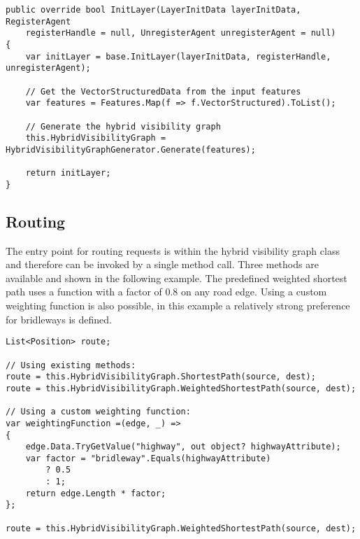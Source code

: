 		\begin{verbatim}
public override bool InitLayer(LayerInitData layerInitData, RegisterAgent
	registerHandle = null, UnregisterAgent unregisterAgent = null)
{
	var initLayer = base.InitLayer(layerInitData, registerHandle, unregisterAgent);
	
	// Get the VectorStructuredData from the input features
	var features = Features.Map(f => f.VectorStructured).ToList();
	
	// Generate the hybrid visibility graph
	this.HybridVisibilityGraph = HybridVisibilityGraphGenerator.Generate(features);
	
	return initLayer;
}
		\end{verbatim}
		
	\subsection*{Routing}
	
		The entry point for routing requests is within the hybrid visibility graph class and therefore can be invoked by a single method call.
		Three methods are available and shown in the following example.
		The predefined weighted shortest path uses a function with a factor of 0.8 on any road edge.
		Using a custom weighting function is also possible, in this example a relatively strong preference for bridleways is defined.
	
		\begin{verbatim}
List<Position> route;

// Using existing methods:
route = this.HybridVisibilityGraph.ShortestPath(source, dest);
route = this.HybridVisibilityGraph.WeightedShortestPath(source, dest);

// Using a custom weighting function:
var weightingFunction =(edge, _) =>
{
	edge.Data.TryGetValue("highway", out object? highwayAttribute);
	var factor = "bridleway".Equals(highwayAttribute)
		? 0.5
		: 1;
	return edge.Length * factor;
};

route = this.HybridVisibilityGraph.WeightedShortestPath(source, dest);
		\end{verbatim}